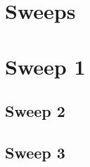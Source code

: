 \chapter{Sweeps}
\label{app:sweep}


\clearpage
\chapter{Sweep 1}
\label{app:sweep_1}


\clearpage
\section{Sweep 2}
\label{app:sweep_2}


\clearpage
\section{Sweep 3}
\label{app:sweep_3}

